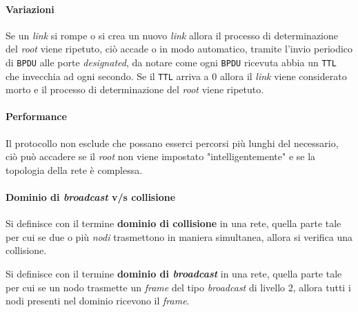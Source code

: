         \paragraph{Variazioni} Se un \textit{link} si rompe o si crea un nuovo \textit{link} allora il processo di determinazione del \textit{root} viene ripetuto, ciò accade o in modo automatico, tramite l'invio periodico di \texttt{BPDU} alle porte \textit{designated}, da notare come ogni \texttt{BPDU} ricevuta abbia un \texttt{TTL} che invecchia ad ogni secondo. Se il \texttt{TTL} arriva a $0$ allora il \textit{link} viene considerato morto e il processo di determinazione del \textit{root} viene ripetuto. 
        \paragraph{Performance} Il protocollo non esclude che possano esserci percorsi più lunghi del necessario, ciò può accadere se il \textit{root} non viene impostato "intelligentemente" e se la topologia della rete è complessa. 
        \paragraph{Dominio di \textit{broadcast} v/s collisione} 
            \begin{definition}
                Si definisce con il termine \textbf{dominio di collisione} in una rete, quella parte tale per cui se due o più \textit{nodi} trasmettono in maniera simultanea, allora si verifica una collisione.
            \end{definition}
            \begin{definition}
                Si definisce con il termine \textbf{dominio di \textit{broadcast}} in una rete, quella parte tale per cui se un nodo trasmette un \textit{frame} del tipo \textit{broadcast} di livello 2, allora tutti i nodi presenti nel dominio ricevono il \textit{frame}.
            \end{definition}
